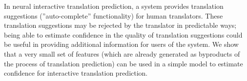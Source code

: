 In neural interactive translation prediction, a system provides translation suggestions (''auto-complete'' functionality) for human translators. These translation suggestions may be rejected by the translator in predictable ways; being able to estimate confidence in the quality of translation suggestions could be useful in providing additional information for users of the system. We show that a very small set of features (which are already generated as byproducts of the process of translation prediction) can be used in a simple model to estimate confidence for interactive translation prediction.
